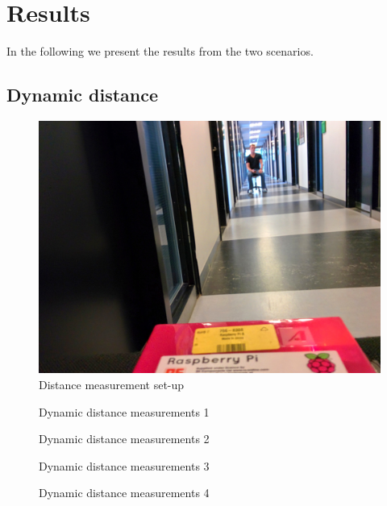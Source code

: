 \section{Results}
\label{sec_results}

In the following we present the results from the two scenarios.

\subsection{Dynamic distance}

\begin{figure}
	\centering
	\includegraphics[width=0.5\paperwidth]{img/hopper_maaling1.jpg}
	\caption{ Distance measurement set-up }
	\label{fig_distance_mesurement}
\end{figure}

\begin{figure}		
	\centering
	
	
	\caption{ Dynamic distance measurements 1 }
	\label{graf_hopper1}
	
%
	\vspace{1.5cm}

	
	
	\caption{ Dynamic distance measurements 2 }
	\label{graf_hopper2}
	
\end{figure}

\begin{figure}		
	\centering
	
	
	\caption{ Dynamic distance measurements 3 }
	\label{graf_hopper3}
	
%
	\vspace{1.5cm}
	
	
	\caption{ Dynamic distance measurements 4 }
	\label{graf_hopper4}
	
\end{figure}

